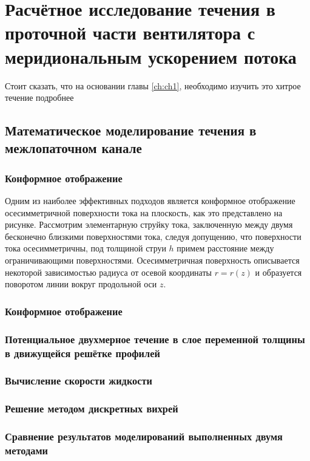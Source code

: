 \chapter{Расчётное исследование течения в проточной части вентилятора с меридиональным ускорением потока}

Стоит сказать, что на основании главы \ref{ch:ch1}, необходимо изучить это хитрое течение подробнее

\section{Математическое моделирование течения в межлопаточном канале}

	\subsection{Конформное отображение}

Одним из наиболее эффективных подходов является конформное отображение осесимметричной поверхности тока на плоскость, как это представлено на рисунке.
Рассмотрим элементарную струйку тока, заключенную между двумя бесконечно близкими поверхностями тока, следуя допущению, что поверхности тока осесимметричны, под толщиной струи \(h\) примем расстояние между ограничивающими поверхностями. Осесимметричная поверхность описывается некоторой зависимостью радиуса от осевой координаты \(r=r(z)\) и образуется поворотом линии вокруг продольной оси \(z\).

	\subsection{Конформное отображение}
	\subsection{Потенциальное двухмерное течение в слое переменной толщины в движущейся решётке профилей}
	\subsection{Вычисление скорости жидкости}
	\subsection{Решение методом дискретных вихрей}
	\subsection{Сравнение результатов моделирований выполненных двумя методами}

